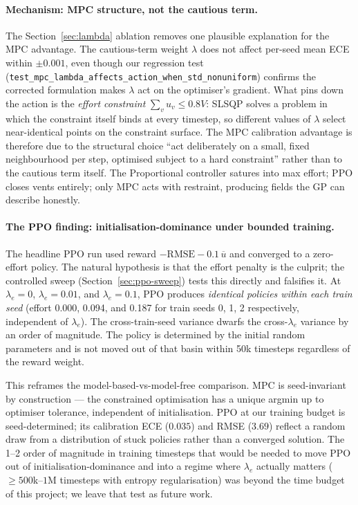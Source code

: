 \documentclass[11pt,letterpaper]{article}
\begin{document}
\paragraph{Mechanism: MPC structure, not the cautious term.}
The Section~\ref{sec:lambda} ablation removes one plausible explanation
for the MPC advantage. The cautious-term weight $\lambda$ does not
affect per-seed mean ECE within $\pm 0.001$, even though our regression
test (\texttt{test\_mpc\_lambda\_affects\_action\_when\_std\_nonuniform})
confirms the corrected formulation makes $\lambda$ act on the optimiser's
gradient. What pins down the action is the \emph{effort constraint}
$\sum_v u_v \le 0.8 V$: SLSQP solves a problem in which the constraint
itself binds at every timestep, so different values of $\lambda$ select
near-identical points on the constraint surface. The MPC calibration
advantage is therefore due to the structural choice ``act deliberately
on a small, fixed neighbourhood per step, optimised subject to a hard
constraint'' rather than to the cautious term itself. The Proportional
controller satures into max effort; PPO closes vents entirely; only MPC
acts with restraint, producing fields the GP can describe honestly.

\paragraph{The PPO finding: initialisation-dominance under bounded training.}
The headline PPO run used reward $-\mathrm{RMSE} - 0.1\,\overline{u}$ and
converged to a zero-effort policy. The natural hypothesis is that the
effort penalty is the culprit; the controlled sweep
(Section~\ref{sec:ppo-sweep}) tests this directly and falsifies it. At
$\lambda_e = 0$, $\lambda_e = 0.01$, and $\lambda_e = 0.1$, PPO produces
\emph{identical policies within each train seed} (effort 0.000, 0.094,
and 0.187 for train seeds 0, 1, 2 respectively, independent of
$\lambda_e$). The cross-train-seed variance dwarfs the
cross-$\lambda_e$ variance by an order of magnitude. The policy is
determined by the initial random parameters and is not moved out of
that basin within 50k timesteps regardless of the reward weight.

This reframes the model-based-vs-model-free comparison. MPC is
seed-invariant by construction --- the constrained optimisation has a
unique argmin up to optimiser tolerance, independent of initialisation.
PPO at our training budget is seed-determined; its calibration ECE
($0.035$) and RMSE ($3.69$) reflect a random draw from a distribution
of stuck policies rather than a converged solution. The 1--2 order of
magnitude in training timesteps that would be needed to move PPO out
of initialisation-dominance and into a regime where $\lambda_e$
actually matters ($\ge 500$k--$1$M timesteps with entropy regularisation)
was beyond the time budget of this project; we leave that test as
future work.
\end{document}
